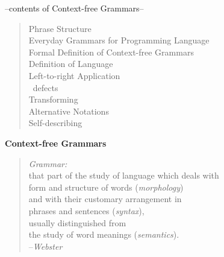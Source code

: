 




\begin{center}
  \begin{small}
    \noindent --contents of Context-free Grammars--
    \begin{quote} \raggedright
        Phrase Structure\\
        Everyday Grammars for Programming Language\\
        Formal Definition of Context-free Grammars\\
        Definition of Language\\
        Left-to-right Application\\
        \cfg\ defects\\
        Transforming \\
        Alternative Notations\\
        Self-describing \cfg \\
    \end{quote}
  \end{small}
\end{center}

\vspace{1em}

\begin{center} 
      {\large \bf Context-free Grammars} 
\end{center}
\vspace{1em}

\begin{quote} \raggedleft
			{\em Grammar:} 					\\
			that part of the study of language which deals with \\
			form and structure of words ({\em morphology}) 	\\
			and with their customary arrangement in 	\\
			phrases and sentences ({\em syntax}),		\\
			usually distinguished from 			\\
			the study of word meanings ({\em semantics}).	\\
			{--\em Webster}
\end{quote}
\vspace{1em}

